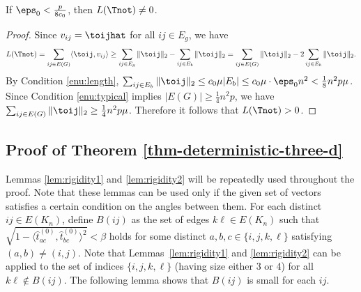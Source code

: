 \begin{lemma} \label{lem:T0-feasible-three-d} 
If $\eps_0 < \frac{p}{8c_0}$, then $L(\Tnot) \neq 0$.
\end{lemma}
\begin{proof}
Since $v_{ij} = \toijhat$ for all $ij \in E_g$, we have
\[
	L(\Tnot) = \sum_{ij \in E(G)} \langle \toij, v_{ij} \rangle 
	\geq \sum_{ij \in E_g} \| \toij\|_2 - \sum_{ij \in E_b} \| \toij \|_2
	= \sum_{ij \in E(G)} \| \toij\|_2 - 2\sum_{ij \in E_b} \| \toij \|_2.
\]
By Condition \ref{enu:length},  $\sum_{ij \in E_b} \| \toij \|_2 \le c_0 \mu |E_b| \le c_0\mu \cdot \eps_0n^2 < \frac{1}{8}n^2p \mu$. Since Condition \ref{enu:typical} implies $|E(G)| \ge \frac{1}{4}n^2p$, we have
$\sum_{ij \in E(G)} \| \toij\|_2 \ge \frac{1}{4}n^2p\mu$. Therefore it follows that $L(\Tnot) > 0$. 
\end{proof}








\subsection{Proof of Theorem \ref{thm-deterministic-three-d}} \label{sec-proof-deterministic-3d}

Lemmas \ref{lem:rigidity1} and \ref{lem:rigidity2} will be repeatedly
used throughout the proof. Note that these lemmas can be used only
if the given set of vectors satisfies a certain condition on the angles between
them. For each distinct $ij\in E(K_{n})$, define $B(ij)$ as the
set of edges $k\ell\in E(K_{n})$ such that $\sqrt{1-\langle\hat{t}_{ac}^{(0)},\hat{t}_{bc}^{(0)}\rangle^{2}}<\beta$
holds for some distinct $a,b,c\in\{i,j,k,\ell\}$ satisfying
$(a,b)\neq(i,j)$. Note that Lemmas~\ref{lem:rigidity1} and \ref{lem:rigidity2} can be applied to the
set of indices $\{i,j,k,\ell\}$ (having size either 3 or 4) for all $k\ell \notin B(ij)$.
The following lemma shows that $B(ij)$ is small for each $ij$.


